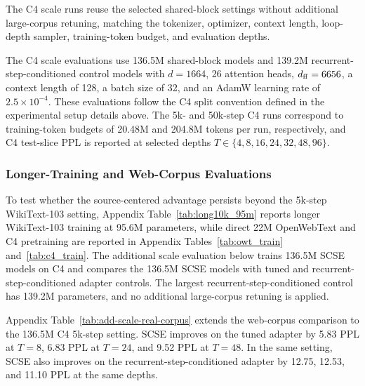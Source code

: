 \documentclass[letterpaper]{article} %
\newcommand{\SCSE}{\textsc{SCSE}}
\theoremstyle{remark}
\begin{document}
The C4 scale runs reuse the selected shared-block settings without additional large-corpus retuning, matching the tokenizer, optimizer, context length, loop-depth sampler, training-token budget, and evaluation depths.

The C4 scale evaluations use 136.5M shared-block models and 139.2M recurrent-step-conditioned control models with $d=1664$, 26 attention heads, $d_{\rm ff}=6656$, a context length of 128, a batch size of 32, and an AdamW learning rate of $2.5\times 10^{-4}$.  These evaluations follow the C4 split convention defined in the experimental setup details above.  The 5k- and 50k-step C4 runs correspond to training-token budgets of 20.48M and 204.8M tokens per run, respectively, and C4 test-slice PPL is reported at selected depths $T\in\{4,8,16,24,32,48,96\}$.

\subsubsection{Longer-Training and Web-Corpus Evaluations}
\label{app:scale-real-corpus}

To test whether the source-centered advantage persists beyond the 5k-step WikiText-103 setting, Appendix Table~\ref{tab:long10k_95m} reports longer WikiText-103 training at 95.6M parameters, while direct 22M OpenWebText and C4 pretraining are reported in Appendix Tables~\ref{tab:owt_train} and~\ref{tab:c4_train}.  The additional scale evaluation below trains 136.5M \SCSE{} models on C4 and compares the 136.5M \SCSE{} models with tuned and recurrent-step-conditioned adapter controls.  The largest recurrent-step-conditioned control has 139.2M parameters, and no additional large-corpus retuning is applied.

Appendix Table~\ref{tab:add-scale-real-corpus} extends the web-corpus comparison to the 136.5M C4 5k-step setting.  \SCSE{} improves on the tuned adapter by 5.83 PPL at $T=8$, 6.83 PPL at $T=24$, and 9.52 PPL at $T=48$.  In the same setting, \SCSE{} also improves on the recurrent-step-conditioned adapter by 12.75, 12.53, and 11.10 PPL at the same depths.
\end{document}
